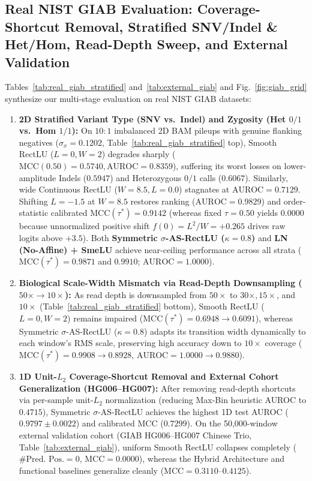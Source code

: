 \documentclass[10pt,a4paper]{article}
\begin{document}
\subsection{Real NIST GIAB Evaluation: Coverage-Shortcut Removal, Stratified SNV/Indel \& Het/Hom, Read-Depth Sweep, and External Validation}
Tables~\ref{tab:real_giab_stratified} and~\ref{tab:external_giab} and Fig.~\ref{fig:giab_grid} synthesize our multi-stage evaluation on real NIST GIAB datasets:
\begin{enumerate}
    \item \textbf{2D Stratified Variant Type (SNV vs.\ Indel) and Zygosity (Het $0/1$ vs.\ Hom $1/1$):} On $10:1$ imbalanced 2D BAM pileups with genuine flanking negatives ($\sigma_x = 0.1202$, Table~\ref{tab:real_giab_stratified} top), Smooth RectLU ($L=0, W=2$) degrades sharply ($\text{MCC}(0.50)=0.5740, \text{AUROC}=0.8359$), suffering its worst losses on lower-amplitude Indels ($0.5947$) and Heterozygous $0/1$ calls ($0.6067$). Similarly, wide Continuous RectLU ($W=8.5, L=0.0$) stagnates at $\text{AUROC}=0.7129$. Shifting $L=-1.5$ at $W=8.5$ restores ranking ($\text{AUROC} = 0.9829$) and order-statistic calibrated $\text{MCC}(\tau^*) = 0.9142$ (whereas fixed $\tau=0.50$ yields $0.0000$ because unnormalized positive shift $f(0) = L^2/W = +0.265$ drives raw logits above $+3.5$). Both \textbf{Symmetric $\sigma$-AS-RectLU ($\kappa=0.8$)} and \textbf{LN (No-Affine) + SmeLU} achieve near-ceiling performance across all strata ($\text{MCC}(\tau^*) = 0.9871$ and $0.9910$; $\text{AUROC} = 1.0000$).
    \item \textbf{Biological Scale-Width Mismatch via Read-Depth Downsampling ($50\times \to 10\times$):} As read depth is downsampled from $50\times$ to $30\times, 15\times$, and $10\times$ (Table~\ref{tab:real_giab_stratified} bottom), Smooth RectLU ($L=0, W=2$) remains impaired ($\text{MCC}(\tau^*) = 0.6948 \to 0.6091$), whereas Symmetric $\sigma$-AS-RectLU ($\kappa=0.8$) adapts its transition width dynamically to each window's RMS scale, preserving high accuracy down to $10\times$ coverage ($\text{MCC}(\tau^*) = 0.9908 \to 0.8928$, $\text{AUROC} = 1.0000 \to 0.9880$).
    \item \textbf{1D Unit-$L_2$ Coverage-Shortcut Removal and External Cohort Generalization (HG006--HG007):} After removing read-depth shortcuts via per-sample unit-$L_2$ normalization (reducing Max-Bin heuristic AUROC to $0.4715$), Symmetric $\sigma$-AS-RectLU achieves the highest 1D test AUROC ($0.9797 \pm 0.0022$) and calibrated MCC ($0.7299$). On the 50,000-window external validation cohort (GIAB HG006--HG007 Chinese Trio, Table~\ref{tab:external_giab}), uniform Smooth RectLU collapses completely ($\#\text{Pred.\ Pos.} = 0$, $\text{MCC}=0.0000$), whereas the Hybrid Architecture and functional baselines generalize cleanly ($\text{MCC} = 0.3110$--$0.4125$).
\end{enumerate}
\end{document}
